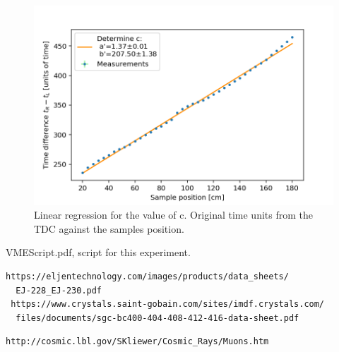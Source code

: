 \documentclass[]{article}
\begin{document}
\begin{figure}[H]
\centering
\includegraphics[width=1\textwidth]{Plots/PosTimeUnit.png}
\caption{Linear regression for the value of c. Original time units from the TDC against the samples position. }
\label{fig:c fit units}
\end{figure}

\newpage
\begin{thebibliography}{}

 VMEScript.pdf, script for this experiment.

 \begin{verbatim}
https://eljentechnology.com/images/products/data_sheets/
  EJ-228_EJ-230.pdf
 https://www.crystals.saint-gobain.com/sites/imdf.crystals.com/
  files/documents/sgc-bc400-404-408-412-416-data-sheet.pdf
\end{verbatim} 

 \begin{verbatim}
http://cosmic.lbl.gov/SKliewer/Cosmic_Rays/Muons.htm
\end{verbatim}

\end{thebibliography}
\end{document}
